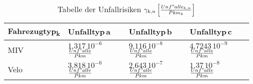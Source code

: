 %
%
%
%

\begin{table}[hbt!]
\center
%
%
\begin{tabular}{@{}p{2.6cm} p{3.3cm} p{3.3cm} p{3.3cm}@{}} \\   
\toprule
\textbf{Fahrezugtyp\textsubscript{k}} & \textbf{Unfalltyp\,a} & \textbf{Unfalltyp\,b} & \textbf{Unfalltyp\,c} \\
\midrule
MIV      & \(1.317\,\mathrm{10^{-6}}\) $\frac{Unf"alle}{Pkm}$ & \(9.116\,\mathrm{10^{-8}}\) $\frac{Unf"alle}{Pkm}$ & \(4.7243\,\mathrm{10^{-9}}\) $\frac{Unf"alle}{Pkm}$ \\
Velo	 & \(3.818\,\mathrm{10^{-6}}\)  $\frac{Unf"alle}{Pkm}$ & \(2.643\,\mathrm{10^{-7}}\)  $\frac{Unf"alle}{Pkm}$ & \(1.37\,\mathrm{10^{-8}}\)  $\frac{Unf"alle}{Pkm}$  \\

\bottomrule

\end{tabular}
\caption[Tabelle der Unfallrisiken]{Tabelle der Unfallrisiken $\gamma_{k,n}\,\Bigl[\frac{Unf"alle_{k,n}}{Pkm_{k}}\Bigl]$}
\label{tab:t-06-01-Unfallrisiko}
\end{table}


%


